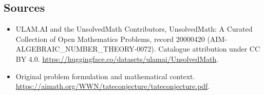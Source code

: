 \documentclass[11pt]{article}
\begin{document}
\subsection{Sources}
\begin{itemize}
\item[\hypertarget{source:20000420:1}{S1}] ULAM.AI and the UnsolvedMath Contributors, UnsolvedMath: A Curated Collection of Open Mathematics Problems, record 20000420 (AIM-ALGEBRAIC\_NUMBER\_THEORY-0072). Catalogue attribution under CC BY 4.0.
\url{https://huggingface.co/datasets/ulamai/UnsolvedMath}.
\item[\hypertarget{source:20000420:2}{S2}] Original problem formulation and mathematical context.
\url{https://aimath.org/WWN/tateconjecture/tateconjecture.pdf}.
\end{itemize}
\label{end:20000420}
\end{document}
